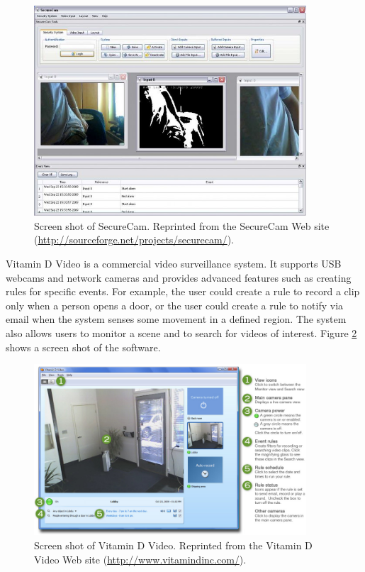 \begin{figure}[t]
  \begin{center}
    \includegraphics[width=4in]{figures/securecam.jpg}
    \caption[Screen shot of SecureCam.]{\small Screen shot of
      SecureCam. Reprinted from the SecureCam Web site
      (\url{http://sourceforge.net/projects/securecam/}).}
    \label{fig:securecam}
  \end{center}
\end{figure}

Vitamin D Video  is a commercial video
surveillance system. It supports USB webcams and network cameras and
provides advanced features such as creating rules for specific events.
For example, the user could create a rule to record a clip only when a
person opens a door, or the user could create a rule to notify via
email when the system senses some movement in a defined region. The
system also allows users to monitor a scene and to search for videos
of interest.  Figure \ref{fig:vitamind} shows a screen shot of the
software.

\begin{figure}[t]
  \begin{center}
    \includegraphics[width=4in]{figures/vitamind.jpg}
    \caption[Screen shot of Vitamin D Video.]{\small Screen shot of
      Vitamin D Video. Reprinted from the Vitamin D Video Web site
      (\url{http://www.vitamindinc.com/}).}
    \label{fig:vitamind}
  \end{center}
\end{figure}

